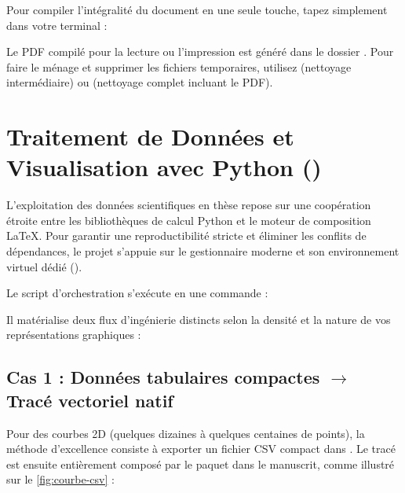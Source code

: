 Pour compiler l'intégralité du document en une seule touche, tapez simplement dans votre terminal :
\begin{center}
\end{center}
Le PDF compilé pour la lecture ou l'impression est généré dans le dossier .
Pour faire le ménage et supprimer les fichiers temporaires, utilisez  (nettoyage intermédiaire)
ou  (nettoyage complet incluant le PDF).

\section{Traitement de Données et Visualisation avec Python ()}
\label{sec:python-pipeline}

L'exploitation des données scientifiques en thèse repose sur une coopération étroite
entre les bibliothèques de calcul Python et le moteur de composition \LaTeX{}.
Pour garantir une reproductibilité stricte et éliminer les conflits de dépendances,
le projet s'appuie sur le gestionnaire moderne  et son environnement virtuel dédié ().

Le script d'orchestration  s'exécute en une commande :
\begin{center}
\end{center}

Il matérialise deux flux d'ingénierie distincts selon la densité et la nature de vos représentations graphiques :

\subsection[Cas 1 : Données tabulaires compactes vers Tracé vectoriel natif]{Cas 1 : Données tabulaires compactes \texorpdfstring{$\to$}{vers} Tracé vectoriel natif \texorpdfstring{}{pgfplots}}
\label{subsec:cas1-pgfplots}

Pour des courbes 2D (quelques dizaines à quelques centaines de points),
la méthode d'excellence consiste à exporter un fichier CSV compact dans .
Le tracé est ensuite entièrement composé par le paquet  dans le manuscrit,
comme illustré sur le \cref{fig:courbe-csv} :


